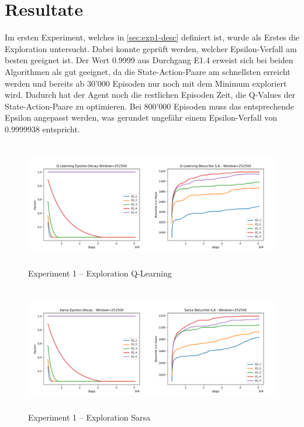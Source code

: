 \section{Resultate}
Im ersten Experiment, welches in \ref{sec:exp1-desc} definiert ist, wurde als Erstes die Exploration untersucht. Dabei konnte geprüft werden, welcher Epsilon-Verfall am besten geeignet ist. Der Wert 0.9999 aus Durchgang E1.4 erweist sich bei beiden Algorithmen als gut geeignet, da die State-Action-Paare am schnellsten erreicht werden und bereits ab 30'000 Episoden nur noch mit dem Minimum exploriert wird. Dadurch hat der Agent noch die restlichen Episoden Zeit, die Q-Values der State-Action-Paare zu optimieren. Bei 800'000 Episoden muss das entsprechende Epsilon angepasst werden, was gerundet ungefähr einem Epsilon-Verfall von 0.9999938 entspricht.
\begin{figure}[H]
\centering
  \includegraphics[height=5.5cm]{img/plots/exp-1/Exploration_Q.png}
  \caption{Experiment 1 – Exploration Q-Learning}
    \label{fig:e1-expl-q}
\end{figure} 
\begin{figure}[H]
\centering
  \includegraphics[height=5.5cm]{img/plots/exp-1/Exploration_Sarsa.png}
  \caption{Experiment 1 – Exploration Sarsa}
    \label{fig:e1-expl-q}
\end{figure} 

